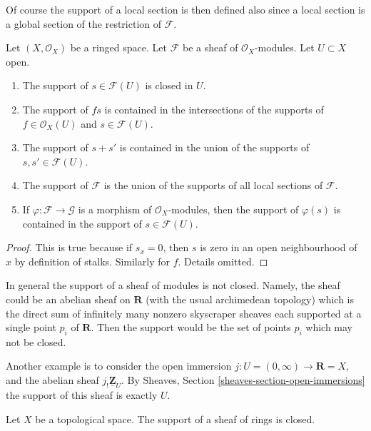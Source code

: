 \noindent
Of course the support of a local section is then defined also
since a local section is a global section of the restriction of
$\mathcal{F}$.

\begin{lemma}
\label{lemma-support-section-closed}
Let $(X, \mathcal{O}_X)$ be a ringed space.
Let $\mathcal{F}$ be a sheaf of $\mathcal{O}_X$-modules.
Let $U \subset X$ open.
\begin{enumerate}
\item The support of $s \in \mathcal{F}(U)$ is closed in $U$.
\item The support of $fs$ is contained in the intersections
of the supports of $f \in \mathcal{O}_X(U)$ and $s \in \mathcal{F}(U)$.
\item The support of $s + s'$ is contained in the union of
the supports of $s, s' \in \mathcal{F}(U)$.
\item The support of $\mathcal{F}$ is the union of the supports
of all local sections of $\mathcal{F}$.
\item If $\varphi : \mathcal{F} \to \mathcal{G}$ is a morphism of
$\mathcal{O}_X$-modules, then the support of $\varphi(s)$ is
contained in the support of $s \in \mathcal{F}(U)$.
\end{enumerate}
\end{lemma}

\begin{proof}
This is true because if $s_x = 0$, then $s$ is zero
in an open neighbourhood of $x$ by definition of stalks.
Similarly for $f$. Details omitted.
\end{proof}

\noindent
In general the support of a sheaf of modules is not closed.
Namely, the sheaf could be an abelian sheaf on $\mathbf{R}$
(with the usual archimedean topology)
which is the direct sum of infinitely many nonzero skyscraper
sheaves each supported at a single point $p_i$ of $\mathbf{R}$.
Then the support would be the set of points $p_i$
which may not be closed.

\medskip\noindent
Another example is to consider the open immersion
$j : U = (0 , \infty) \to \mathbf{R} = X$, and the abelian sheaf
$j_!\underline{\mathbf{Z}}_U$. By Sheaves, Section
\ref{sheaves-section-open-immersions} the support of
this sheaf is exactly $U$.

\begin{lemma}
\label{lemma-support-sheaf-rings-closed}
Let $X$ be a topological space.
The support of a sheaf of rings is closed.
\end{lemma}

